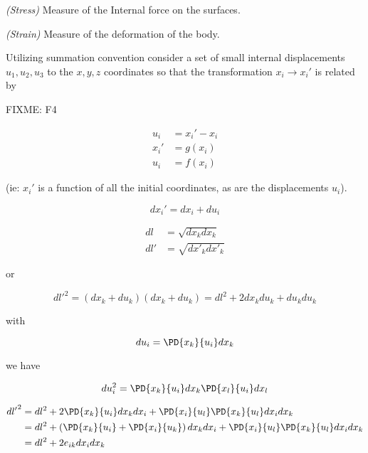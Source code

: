 \begin{definition}
\emph{(Stress)}
\label{dfn:continuumL2:10}
Measure of the Internal force on the surfaces.
\end{definition}

\begin{definition}
\emph{(Strain)}
\label{dfn:continuumL2:30}
Measure of the deformation of the body.
\end{definition}

Utilizing summation convention consider a set of small internal displacements $u_1, u_2, u_3$ to the $x, y, z$ coordinates so that the transformation $x_i \rightarrow x_i'$ is related by

FIXME: F4

\begin{align}\label{eqn:continuumL2:50}
u_i &= x_i' - x_i \\
x_i' &= g(x_i) \\
u_i &= f(x_i)
\end{align}

(ie: $x_i'$ is a function of all the initial coordinates, as are the displacements $u_i$).

\begin{equation}\label{eqn:continuumL2:70}
dx_i' = dx_i + du_i
\end{equation}

\begin{align}\label{eqn:continuumL2:90}
dl &= \sqrt{dx_k dx_k} \\
dl' &= \sqrt{d{x'}_k d{x'}_k}
\end{align}

or

\begin{equation}\label{eqn:continuumL2:110}
{dl'}^2 = 
(dx_k + du_k)
(dx_k + du_k)
= 
dl^2 + 2 dx_k du_k + du_k du_k
\end{equation}

with 

\begin{equation}\label{eqn:continuumL2:130}
du_i = \PD{x_k}{u_i} dx_k
\end{equation}

we have

\begin{equation}\label{eqn:continuumL2:150}
du_i^2 = 
\PD{x_k}{u_i} dx_k
\PD{x_l}{u_i} dx_l
\end{equation}

\begin{align*}
{dl'}^2 
&= 
dl^2 
+ 2 \PD{x_k}{u_i} dx_k dx_i 
+ \PD{x_i}{u_l} 
\PD{x_k}{u_l} 
dx_i dx_k \\
&= 
dl^2 
+ 
\left(
\PD{x_k}{u_i} 
+
\PD{x_i}{u_k} 
\right)
dx_k dx_i 
+ \PD{x_i}{u_l} 
\PD{x_k}{u_l} 
dx_i dx_k \\
&=
dl^2 
+ 
2 e_{ik} dx_i dx_k
\end{align*}

